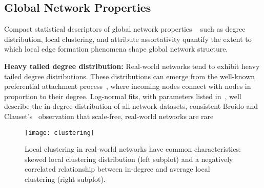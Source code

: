 %


\subsection{Global Network Properties}
\label{subsec:factors}

Compact statistical descriptors of global network properties ~\cite{newman2010networks}
such as degree distribution, local clustering, and attribute assortativity
quantify the extent to which local edge formation phenomena shape global network
structure.

\textbf{Heavy tailed degree distribution:}
Real-world networks tend to exhibit heavy tailed degree distributions.
These distributions can emerge from the well-known preferential attachment
process~\cite{simon1955class,barabasi1999emergence}, where incoming nodes
connect with nodes in proportion to their degree.
Log-normal fits, with parameters listed in~, well describe
the in-degree distribution of all network datasets, consistent Broido and
Clauset's~\cite{broido2018scale} observation that scale-free, real-world networks
are rare

\begin{figure}[b]
 \centering
 \texttt{[image: clustering]}
 \caption{
    Local clustering in real-world networks have common characteristics:
    skewed local clustering distribution (left subplot) and a negatively correlated
    relationship between in-degree and average local clustering (right subplot).
 }
 \label{fig:cc_dc}
\end{figure}

